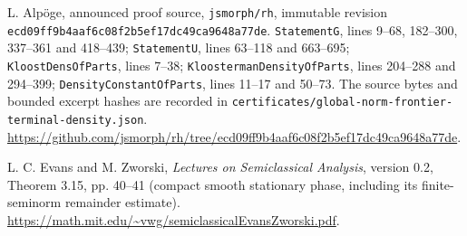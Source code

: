 L. Alp\"oge, announced proof source, \texttt{jsmorph/rh}, immutable
revision \texttt{ecd09ff9b4aaf6c08f2b5ef17dc49ca9648a77de}.
\texttt{StatementG}, lines 9--68, 182--300, 337--361 and 418--439;
\texttt{StatementU}, lines 63--118 and 663--695;
\texttt{KloostDensOfParts}, lines 7--38;
\texttt{KloostermanDensityOfParts}, lines 204--288 and 294--399;
\texttt{DensityConstantOfParts}, lines 11--17 and 50--73.
The source bytes and bounded excerpt hashes are recorded in
\texttt{certificates/global-norm-frontier-terminal-density.json}.
\url{https://github.com/jsmorph/rh/tree/ecd09ff9b4aaf6c08f2b5ef17dc49ca9648a77de}.

L. C. Evans and M. Zworski, \emph{Lectures on Semiclassical Analysis},
version 0.2, Theorem 3.15, pp. 40--41 (compact smooth stationary
phase, including its finite-seminorm remainder estimate).
\url{https://math.mit.edu/~vwg/semiclassicalEvansZworski.pdf}.

